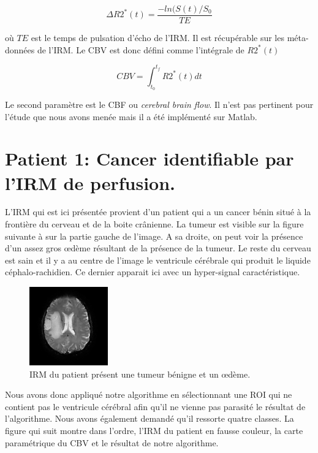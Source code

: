 \begin{equation}
\Delta R2^*(t) = \frac{-ln(S(t)/S_0}{TE}
\end{equation}

où $TE$ est le temps de pulsation d'écho de l'IRM. Il est récupérable sur les méta-données de l'IRM. Le CBV est donc défini comme l'intégrale de $R2^*(t)$

\begin{equation}
CBV = \int^{t_f}_{t_0} R2^*(t) dt
\end{equation}

Le second paramètre est le CBF ou \textit{cerebral brain flow}. Il n'est pas pertinent pour l'étude que nous avons menée mais il a été implémenté sur Matlab.

\medskip



\section{Patient 1: Cancer identifiable par l'IRM de perfusion.}

L'IRM qui est ici présentée provient d'un patient qui a un cancer bénin situé à la frontière du cerveau et de la boite crânienne. La tumeur est visible sur la figure suivante à sur la partie gauche de l'image. A sa droite, on peut voir la présence d'un assez gros œdème résultant de la présence de la tumeur. Le reste du cerveau est sain et il y a au centre de l'image le ventricule cérébrale qui produit le liquide céphalo-rachidien. Ce dernier apparait ici avec un hyper-signal caractéristique.

\begin{figure}[H]
\centering
    \includegraphics[scale=2,angle=0]{Images/Patient4IRM.png}
    \caption{IRM du patient présent une tumeur bénigne et un œdème.}
    \label{fig:patient4IRM}
\end{figure}

Nous avons donc appliqué notre algorithme en sélectionnant une ROI qui ne contient pas le ventricule cérébral afin qu'il ne vienne pas parasité le résultat de l'algorithme. Nous avons également demandé qu'il ressorte quatre classes. La figure qui suit montre dans l'ordre, l'IRM du patient en fausse couleur, la carte paramétrique du CBV et le résultat de notre algorithme.

